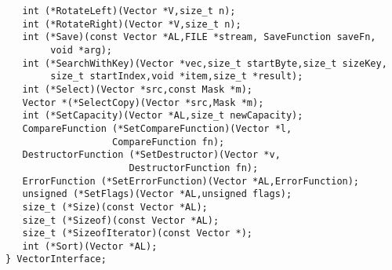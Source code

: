 \begin{verbatim}
   int (*RotateLeft)(Vector *V,size_t n);
   int (*RotateRight)(Vector *V,size_t n);
   int (*Save)(const Vector *AL,FILE *stream, SaveFunction saveFn,
        void *arg);
   int (*SearchWithKey)(Vector *vec,size_t startByte,size_t sizeKey,
        size_t startIndex,void *item,size_t *result);
   int (*Select)(Vector *src,const Mask *m);
   Vector *(*SelectCopy)(Vector *src,Mask *m);
   int (*SetCapacity)(Vector *AL,size_t newCapacity);
   CompareFunction (*SetCompareFunction)(Vector *l,
                   CompareFunction fn);
   DestructorFunction (*SetDestructor)(Vector *v,
                      DestructorFunction fn);
   ErrorFunction (*SetErrorFunction)(Vector *AL,ErrorFunction);
   unsigned (*SetFlags)(Vector *AL,unsigned flags);
   size_t (*Size)(const Vector *AL);
   size_t (*Sizeof)(const Vector *AL);
   size_t (*SizeofIterator)(const Vector *);
   int (*Sort)(Vector *AL);
} VectorInterface;
\end{verbatim}
